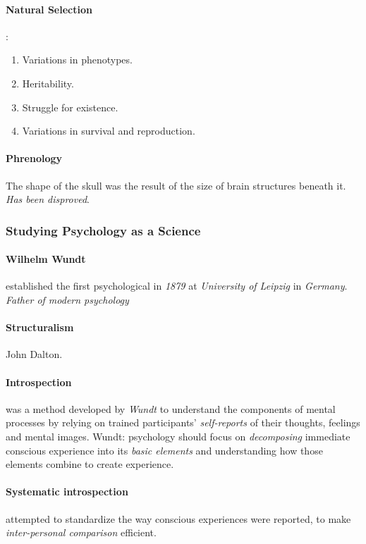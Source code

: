 \documentclass{article}
\begin{document}
 	\paragraph{Natural Selection}:
 	\begin{enumerate}
 		\item Variations in phenotypes.
 		\item Heritability.
 		\item Struggle for existence.
 		\item Variations in survival and reproduction.
 	\end{enumerate}
 	\paragraph{Phrenology} The shape of the skull was the result of the size of brain structures beneath it.
 		\newline \emph{Has been disproved}.
 	\subsubsection{Studying Psychology as a Science}
 	\paragraph{Wilhelm Wundt} established the first psychological in \emph{1879} at \emph{University of Leipzig} in \emph{Germany}.
 		\newline \emph{Father of modern psychology}
 	\paragraph{Structuralism} John Dalton.
 	\paragraph{Introspection} was a method developed by \emph{Wundt} to understand the components of mental processes by relying on trained participants' \emph{self-reports} of their thoughts, feelings and mental images.
 		\newline Wundt: psychology should focus on \emph{decomposing} immediate conscious experience into its \emph{basic elements} and understanding how those elements combine to create experience.
 	\paragraph{Systematic introspection} attempted to standardize the way conscious experiences were reported, to make \emph{inter-personal comparison} efficient.
\end{document}
